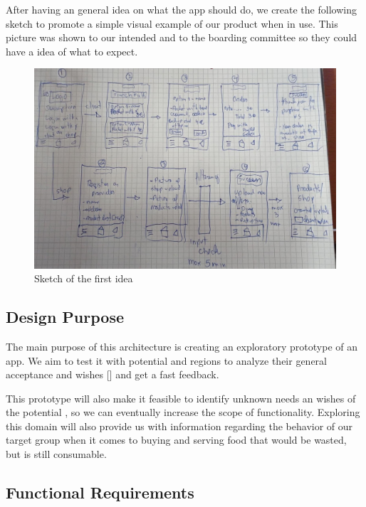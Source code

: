 After having an general idea on what the \gls{app} should do, we create the following sketch to promote a simple visual 
example of our product when in use. This picture was shown to our intended  and to the boarding committee 
so they could have a idea of what to expect.
 
\begin{figure}[H]
    \centering
    \includegraphics[width=1\textwidth]{assets/sketch.jpeg}
    \caption{Sketch of the first idea}
    \label{fig:sketch}
\end{figure}


\subsection{Design Purpose}

The main purpose of this architecture is creating an exploratory prototype of an \gls{app}. We aim to test it with potential 
 and regions to analyze their general acceptance and wishes [\cite{refbook:DSHC}] and get a fast feedback. 

This prototype will also make it feasible to identify unknown needs an wishes of the potential , so we 
can eventually increase the scope of functionality. Exploring this domain will also provide us with information regarding 
the behavior of our target group when it comes to buying and serving food that would be wasted, but is still consumable.


\newpage
\subsection{Functional Requirements} \label{Requirement_Overview}

